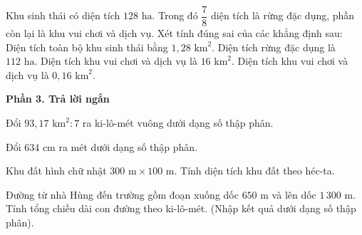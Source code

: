 \begin{ex} %
Khu sinh thái có diện tích $128\text{ ha}$. Trong đó $\dfrac{7}{8}$ diện tích là rừng đặc dụng, phần còn lại là khu vui chơi và dịch vụ. Xét tính đúng sai của các khẳng định sau:
\choiceTF
{\True Diện tích toàn bộ khu sinh thái bằng $1{,}28\text{ km}^2$.}
{\True Diện tích rừng đặc dụng là $112\text{ ha}$.}
{Diện tích khu vui chơi và dịch vụ là $16\text{ km}^2$.}
{\True Diện tích khu vui chơi và dịch vụ là $0{,}16\text{ km}^2$.}
\end{ex}

\textbf{Phần 3. Trả lời ngắn}

\begin{ex} %
Đổi $93{,}17\text{ km}^2 : 7$ ra ki-lô-mét vuông dưới dạng số thập phân.
\end{ex}

\begin{ex} %
Đổi $634\text{ cm}$ ra mét dưới dạng số thập phân.
\end{ex}

\begin{ex} %
Khu đất hình chữ nhật $300\text{ m} \times 100\text{ m}$. Tính diện tích khu đất theo héc-ta.
\end{ex}

\begin{ex} %
Đường từ nhà Hùng đến trường gồm đoạn xuống dốc $650\text{ m}$ và lên dốc $1\,300\text{ m}$. Tính tổng chiều dài con đường theo ki-lô-mét. (Nhập kết quả dưới dạng số thập phân).
\end{ex}

